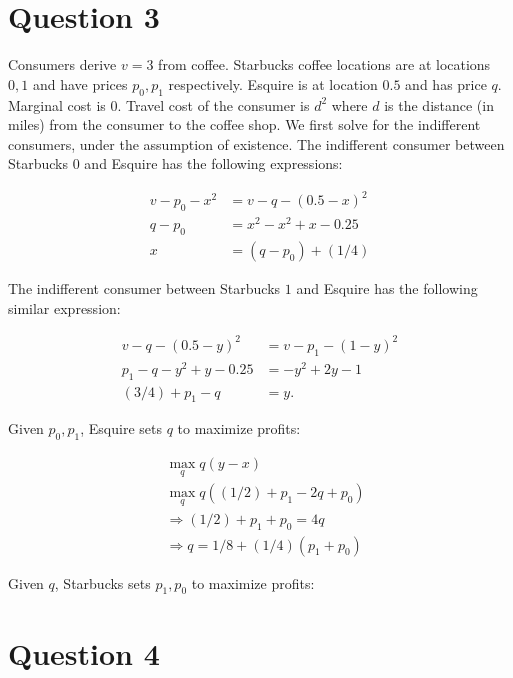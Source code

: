 \documentclass[11pt]{article} %
\begin{document}

\section{Question 3}

Consumers derive $v = 3$ from coffee. Starbucks coffee locations are at locations $0,1$ and have prices $p_0,p_1$ respectively. Esquire is at location $0.5$ and has price $q$. Marginal cost is 0. Travel cost of the consumer is $d^2$ where $d$ is the distance (in miles) from the consumer to the coffee shop. We first solve for the indifferent consumers, under the assumption of existence. The indifferent consumer between Starbucks $0$ and Esquire has the following expressions:

\begin{align*}
v - p_0 - x^2 &= v - q - (0.5 - x)^2 \\
q-p_0 &= x^2 - x^2 + x - 0.25\\
x &= (q-p_0) + (1/4)
\end{align*}

The indifferent consumer between Starbucks $1$ and Esquire has the following similar expression:

\begin{align*}
 v - q - (0.5 - y)^2 &= v - p_1 - (1-y)^2\\
p_1 - q - y^2 + y - 0.25 &= -y^2 + 2y - 1\\
(3/4) + p_1 - q  &= y .
\end{align*}

Given $p_0,p_1$, Esquire sets $q$ to maximize profits:

\begin{align*}
&\max_{q} q(y - x) \\
&\max_{q} q((1/2) + p_1 - 2q  + p_0)\\
&\Rightarrow (1/2) + p_1 + p_0 = 4q \\
&\Rightarrow q = 1/8 + (1/4)(p_1 + p_0)
\end{align*}

Given $q$, Starbucks sets $p_1,p_0$ to maximize profits:
%

\section{Question 4}
\end{document}
